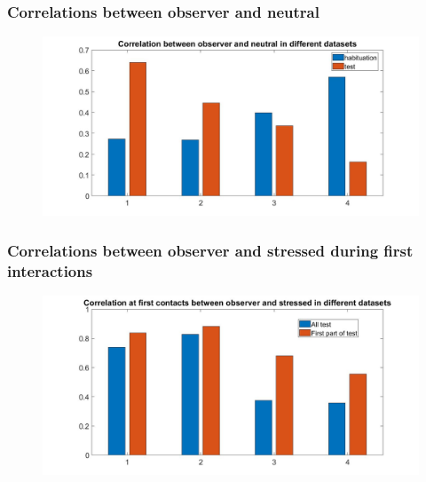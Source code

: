\documentclass{beamer}
\begin{document}
\begin{frame}
\frametitle{ Correlations between observer and neutral}



\begin{figure}[H]
	\begin{center}
		\hspace*{-1.7cm}
		\includegraphics[scale=.32]{corr_bar_neut.jpg} 
	\end{center}  
	
	
\end{figure}

\end{frame}

\begin{frame}
\frametitle{ Correlations between observer and stressed during first interactions}



\begin{figure}[H]
	\begin{center}
		\hspace*{-1.7cm}
		\includegraphics[scale=.32]{corr_bar_contact_stress.jpg} 
	\end{center}  
	
	
\end{figure}

\end{frame}
\end{document}
